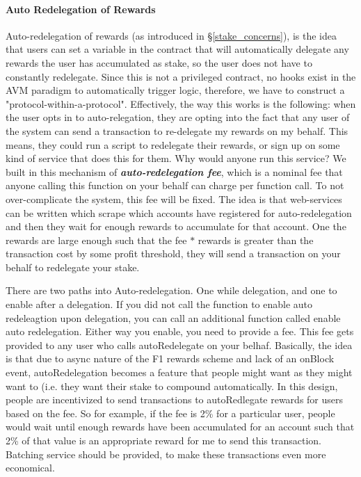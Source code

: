 \paragraph{Auto Redelegation of Rewards} 
Auto-redelegation of rewards (as introduced in \S\ref{stake_concerns}), is the idea that users can set a variable in the contract that will automatically delegate any rewards the user has accumulated as stake, so the user does not have to constantly redelegate. Since this is not a privileged contract, no hooks exist in the AVM paradigm to automatically trigger logic, therefore, we have to construct a "protocol-within-a-protocol". Effectively, the way this works is the following: when the user opts in to auto-relegation, they are opting into the fact that any user of the system can send a transaction to re-delegate my rewards on my behalf. This means, they could run a script to redelegate their rewards, or sign up on some kind of service that does this for them. Why would anyone run this service? We built in this mechanism of \textbf{\textit{auto-redelegation fee}}, which is a nominal fee that anyone calling this function on your behalf can charge per function call. To not over-complicate the system, this fee will be fixed. The idea is that web-services can be written which scrape which accounts have registered for auto-redelegation and then they wait for enough rewards to accumulate for that account. One the rewards are large enough such that the fee $*$ rewards is greater than the transaction cost by some profit threshold, they will send a transaction on your behalf to redelegate your stake.  

There are two paths into Auto-redelegation. One while delegation, and one to enable after a delegation. If you did not call the function to enable auto redeleagtion upon delegation, you can call an additional function called enable auto redelegation. Either way you enable, you need to provide a fee. This fee gets provided to any user who calls autoRedelegate on your belhaf. Basically, the idea is that due to async nature of the F1 rewards scheme and lack of an onBlock event, autoRedelegation becomes a feature that people might want as they might want to  (i.e. they want their stake to compound automatically. In this design, people are incentivized to send transactions to autoRedlegate rewards for users based on the fee. So for example, if the fee is 2\% for a particular user, people would wait until enough rewards have been accumulated for an account such that 2\% of that value is an appropriate reward for me to send this transaction. Batching service should be provided, to make these transactions even more economical. 








